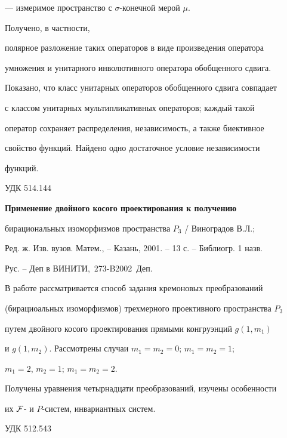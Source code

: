 --- измеримое пространство с $\sigma$-конечной мерой $\mu$.


Получено, в частности,


полярное разложение таких операторов в виде произведения оператора


умножения и унитарного инволютивного оператора обобщенного сдвига.


Показано, что класс унитарных операторов обобщенного сдвига совпадает


с классом унитарных мультипликативных операторов; каждый такой


оператор сохраняет распределения, независимость, а также биективное


свойство функций. Найдено одно достаточное условие независимости


функций.


\bigskip





{\hfill {УДК 514.144}}





{\bf Применение двойного косого проектирования к получению


бирациональных изоморфизмов пространства $P_3$ / Виноградов В.Л.;


Ред. ж. Изв. вузов. Матем., -- Казань, 2001. -- 13 с. -- Библиогр. 1 назв.


Рус. -- Деп в ВИНИТИ, \No\,273-B2002~Деп.}


\medskip





В работе рассматривается способ задания кремоновых преобразований


(бирациоальных изоморфизмов) трехмерного проективного пространства $P_3$


путем двойного косого проектирования прямыми конгруэнций $g(1,m_1)$


и $g(1,m_2)$. Рассмотрены случаи $m_1=m_2=0$; $m_1=m_2=1$;


$m_1=2$, $m_2=1$; $m_1=m_2=2$.


Получены уравнения четырнадцати преобразований, изучены особенности


их $\cal F$- и $P$-систем, инвариантных систем.


\bigskip








{\hfill {УДК 512.543}}





